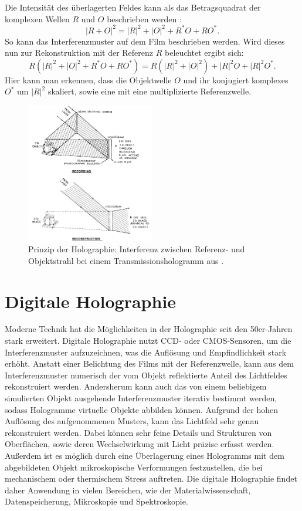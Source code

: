 \documentclass[10pt,twocolumn,a4paper]{article}
\begin{document}
Die Intensität des überlagerten Feldes kann als das Betragsquadrat der komplexen Wellen $R$ und $O$ beschrieben werden \cite{DHM}:
\begin{equation}
    |R + O|^2 = |R|^2 + |O|^2 + R^* O + R O^*.
\end{equation}
So kann das Interferenzmuster auf dem Film beschrieben werden. Wird dieses nun zur Rekonstruktion mit der Referenz $R$ beleuchtet ergibt sich:
\begin{equation}
    R(|R|^2 + |O|^2 + R^* O + R O^*) = R(|R|^2 + |O|^2) + |R|^2O + |R|^2O^*.
\end{equation}
Hier kann man erkennen, dass die Objektwelle $O$ und ihr konjugiert komplexes $O^*$ um $|R|^2$ skaliert, sowie eine mit eine multiplizierte Referenzwelle.

\begin{figure}
    \centering
    \includegraphics[width=0.5\textwidth]{images/holography.png}
    \caption{Prinzip der Holographie: Interferenz zwischen Referenz- und Objektstrahl bei einem Transmissionshologramm aus \cite{Gabor}.}
    \label{fig:holography}
\end{figure}

\section{Digitale Holographie}
Moderne Technik hat die Möglichkeiten in der Holographie seit den 50er-Jahren stark erweitert. Digitale Holographie nutzt CCD- oder CMOS-Sensoren, um die Interferenzmuster aufzuzeichnen, was die Auflösung und Empfindlichkeit stark erhöht. Anstatt einer Belichtung des Films mit der Referenzwelle, kann aus dem Interferenzmuster numerisch der vom Objekt reflektierte Anteil des Lichtfeldes rekonstruiert werden. Andersherum kann auch das von einem beliebigem simulierten Objekt ausgehende Interferenzmuster iterativ bestimmt werden, sodass Hologramme virtuelle Objekte abbilden können. Aufgrund der hohen Auflösung des aufgenommenen Musters, kann das Lichtfeld sehr genau rekonstruiert werden. Dabei können sehr feine Details und Strukturen von Oberflächen, sowie deren Wechselwirkung mit Licht präzise erfasst werden. Außerdem ist es möglich durch eine Überlagerung eines Hologramms mit dem abgebildeten Objekt mikroskopische Verformungen festzustellen, die bei mechanischem oder thermischem Stress auftreten. Die digitale Holographie findet daher Anwendung in vielen Bereichen, wie der Materialwissenschaft, Datenspeicherung, Mikroskopie und Spektroskopie.
\end{document}
